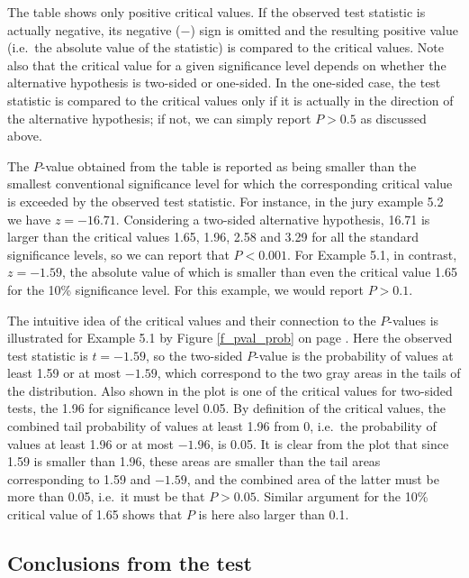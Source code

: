 The table shows only positive critical values. If the observed test
statistic is actually negative, its negative ($-$) sign is omitted and
the resulting positive value (i.e.\ the absolute value of the statistic)
is compared to the critical values. Note also that the critical value
for a given significance level depends on whether the alternative
hypothesis is two-sided or one-sided. In the one-sided case, the test
statistic is compared to the critical  values only if it is actually in
the direction of the alternative hypothesis; if not, we can simply
report $P>0.5$ as discussed above.

The $P$-value obtained from the table is reported as being smaller than
the smallest conventional significance level for which the corresponding
critical value is exceeded by the observed test statistic. For instance,
in the jury example 5.2 we have $z=-16.71$. Considering a two-sided
alternative hypothesis, 16.71 is larger than the critical values 1.65,
1.96, 2.58 and 3.29 for all the standard significance levels, so we can
report that $P<0.001$. For Example 5.1, in contrast, $z=-1.59$, the
absolute value of which is smaller than even the critical value 1.65 for
the 10\% significance level. For this example, we would report $P>0.1$.

The intuitive idea of the critical values and their connection to the
$P$-values is illustrated for Example 5.1 by Figure \ref{f_pval_prob} on
page \pageref{f_pval_prob}. Here the observed test statistic is
$t=-1.59$, so the two-sided $P$-value is the probability of values at
least 1.59 or at most $-1.59$, which correspond to the two gray areas in the
tails of the distribution. Also shown in the plot is one of the critical
values for two-sided tests, the 1.96 for significance level 0.05. By
definition of the critical values, the combined tail probability of
values at least 1.96 from 0, i.e.\ the probability of values at least
1.96 or at most $-1.96$, is 0.05. It is clear from the plot that since
1.59 is smaller than 1.96, these areas are smaller than the tail areas
corresponding to 1.59 and $-1.59$, and the combined area of the latter
must be more than 0.05, i.e.\ it must be that $P>0.05$. Similar argument
for the 10\% critical value of 1.65 shows that $P$ is here also larger
than 0.1.

\subsection{Conclusions from the test}
\label{ss_probs_test1sample_conclusions}

